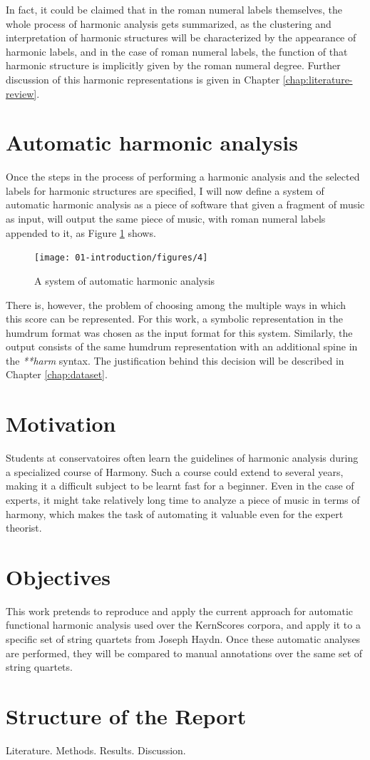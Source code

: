 In fact, it could be claimed that in the roman numeral labels themselves, the whole process of harmonic analysis gets summarized, as the clustering and interpretation of harmonic structures will be characterized by the appearance of harmonic labels, and in the case of roman numeral labels, the function of that harmonic structure is implicitly given by the roman numeral degree. Further discussion of this harmonic representations is given in Chapter \autoref{chap:literature-review}.

\section{Automatic harmonic analysis}
Once the steps in the process of performing a harmonic analysis and the selected labels for harmonic structures are specified, I will now define a system of automatic harmonic analysis as a piece of software that given a fragment of music as input, will output the same piece of music, with roman numeral labels appended to it, as Figure \ref{fig:automatic-harmonic-analysis} shows.

\begin{figure}[h]
  \caption{A system of automatic harmonic analysis}
  \label{fig:automatic-harmonic-analysis}
  \centering
    \texttt{[image: 01-introduction/figures/4]}
\end{figure}

There is, however, the problem of choosing among the multiple ways in which this score can be represented. For this work, a symbolic representation in the humdrum format was chosen as the input format for this system. Similarly, the output consists of the same humdrum representation with an additional spine in the \emph{**harm} syntax. The justification behind this decision will be described in Chapter \ref{chap:dataset}.

\section{Motivation}
Students at conservatoires often learn the guidelines of harmonic analysis during a specialized course of Harmony. Such a course could extend to several years, making it a difficult subject to be learnt fast for a beginner. Even in the case of experts, it might take relatively long time to analyze a piece of music in terms of harmony, which makes the task of automating it valuable even for the expert theorist.

\section{Objectives}
This work pretends to reproduce and apply the current approach for automatic functional harmonic analysis used over the KernScores corpora, and apply it to a specific set of string quartets from Joseph Haydn. Once these automatic analyses are performed, they will be compared to manual annotations over the same set of string quartets.

\section{Structure of the Report}
Literature. Methods. Results. Discussion.

\newpage
